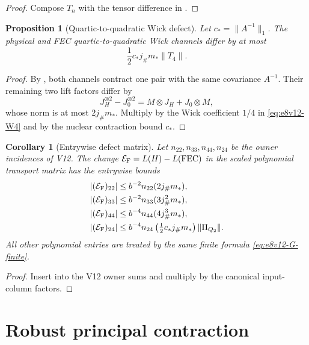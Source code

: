 \documentclass[11pt,oneside]{book}
\newtheorem{proposition}[theorem]{Proposition}
\newtheorem{corollary}[theorem]{Corollary}
\theoremstyle{definition}
\theoremstyle{remark}
\begin{document}
\begin{proof}
Compose \(T_n\) with the tensor difference in
.
\end{proof}

\begin{proposition}[Quartic-to-quadratic Wick defect]
\label{prop:e8v14-Wick-defect}
Let \(c_*=\|A^{-1}\|_1\).  The physical and FEC
quartic-to-quadratic Wick channels differ by at most
\[
 \frac12c_*j_\#m_*\|T_4\|.                          \label{eq:e8v14-Wick-defect}
\]
\end{proposition}

\begin{proof}
By , both channels contract one pair with the same
covariance \(A^{-1}\).  Their remaining two lift factors differ by
\[
 J_H^{\otimes2}-J_0^{\otimes2}
 =M\otimes J_H+J_0\otimes M,
\]
whose norm is at most \(2j_\#m_*\).  Multiply by the Wick coefficient
\(1/4\) in \eqref{eq:e8v12-W4} and by the nuclear contraction bound
\(c_*\).
\end{proof}

\begin{corollary}[Entrywise defect matrix]
\label{cor:e8v14-E}
Let \(n_{22},n_{33},n_{44},n_{24}\) be the owner incidences of V12.
The change \({\mathcal E}_{\rm F}=L(H)-L({\rm FEC})\) in the scaled
polynomial transport matrix has the entrywise bounds
\begin{align}
 |({\mathcal E}_{\rm F})_{22}|
 &\le b^{-2}n_{22}(2j_\#m_*),                       \label{eq:e8v14-E22}\\
 |({\mathcal E}_{\rm F})_{33}|
 &\le b^{-2}n_{33}(3j_\#^2m_*),                     \label{eq:e8v14-E33}\\
 |({\mathcal E}_{\rm F})_{44}|
 &\le b^{-4}n_{44}(4j_\#^3m_*),                     \label{eq:e8v14-E44}\\
 |({\mathcal E}_{\rm F})_{24}|
 &\le b^{-4}n_{24}
       \left(\tfrac12c_*j_\#m_*\right)\|\Pi_{Q_2}\|. \label{eq:e8v14-E24}
\end{align}
All other polynomial entries are treated by the same finite formula
\eqref{eq:e8v12-G-finite}.
\end{corollary}

\begin{proof}
Insert
 into the V12
owner sums and multiply by the canonical input-column factors.
\end{proof}

\section{Robust principal contraction}
\label{sec:e8v14-robust}
\end{document}
